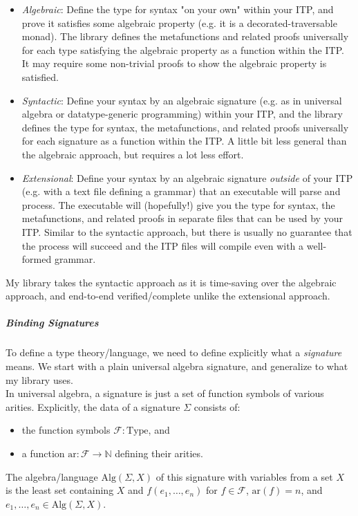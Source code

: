 \documentclass{article}
\theoremstyle{definition}
\begin{document}
\begin{itemize}
	\item \emph{Algebraic}: Define the type for syntax "on your own" within your ITP, and prove it satisfies some algebraic property (e.g. it is a decorated-traversable monad). The library defines the metafunctions and related proofs universally for each type satisfying the algebraic property as a function within the ITP. It may require some non-trivial proofs to show the algebraic property is satisfied.
	\item \emph{Syntactic}: Define your syntax by an algebraic signature (e.g. as in universal algebra or datatype-generic programming) within your ITP, and the library defines the type for syntax, the metafunctions, and related proofs universally for each signature as a function within the ITP. A little bit less general than the algebraic approach, but requires a lot less effort.
	\item \emph{Extensional}: Define your syntax by an algebraic signature \emph{outside} of your ITP (e.g. with a text file defining a grammar) that an executable will parse and process. The executable will (hopefully!) give you the type for syntax, the metafunctions, and related proofs in separate files that can be used by your ITP. Similar to the syntactic approach, but there is usually no guarantee that the process will succeed and the ITP files will compile even with a well-formed grammar.
\end{itemize}
My library takes the syntactic approach as it is time-saving over the algebraic approach, and end-to-end verified/complete unlike the extensional approach.

\subparagraph{Binding Signatures} To define a type theory/language, we need to define explicitly what a \emph{signature} means. We start with a plain universal algebra signature, and generalize to what my library uses.\\

In universal algebra, a signature is just a set of function symbols of various arities. Explicitly, the data of a signature $\Sigma$ consists of:
\begin{itemize}
	\item the function symbols $\mathcal{F} : \text{Type}$, and
	\item a function $\text{ar} : \mathcal{F} \rightarrow \mathbb{N}$ defining their arities.
\end{itemize}
The algebra/language $\text{Alg}(\Sigma,X)$ of this signature with variables from a set $X$ is the least set containing $X$ and $f(e_1,\ldots,e_n)$ for $f \in \mathcal{F}$, $\text{ar}(f) = n$, and $e_1,\ldots,e_n \in \text{Alg}(\Sigma,X)$. \\
\end{document}
